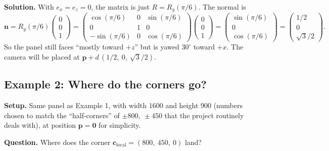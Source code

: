 \documentclass{article}
\begin{document}
\textbf{Solution.} With $e_x = e_z = 0$, the matrix is just
$R = R_y(\pi/6)$. The normal is
\begin{equation*}
\mathbf{n} = R_y(\pi/6) \begin{pmatrix}0\\0\\1\end{pmatrix} = \begin{pmatrix}\cos(\pi/6) & 0 & \sin(\pi/6)\\ 0 & 1 & 0\\ -\sin(\pi/6) & 0 & \cos(\pi/6)\end{pmatrix}\begin{pmatrix}0\\0\\1\end{pmatrix} = \begin{pmatrix}\sin(\pi/6)\\ 0\\ \cos(\pi/6)\end{pmatrix} = \begin{pmatrix}1/2\\ 0\\ \sqrt{3}/2\end{pmatrix}.
\end{equation*}
So the panel still faces ``mostly toward $+z$'' but is yawed
$30^\circ$ toward $+x$. The camera will be placed at
$\mathbf{p} + d\,(1/2,\ 0,\ \sqrt{3}/2)$.

\subsection*{Example 2: Where do the corners go?}

\textbf{Setup.} Same panel as Example 1, with width $1600$ and height
$900$ (numbers chosen to match the ``half-corners'' of $\pm 800,\ \pm 450$
that the project routinely deals with), at position $\mathbf{p} = \mathbf{0}$
for simplicity.

\textbf{Question.} Where does the corner $\mathbf{c}_\text{local} = (800,\ 450,\ 0)$ land?
\end{document}
